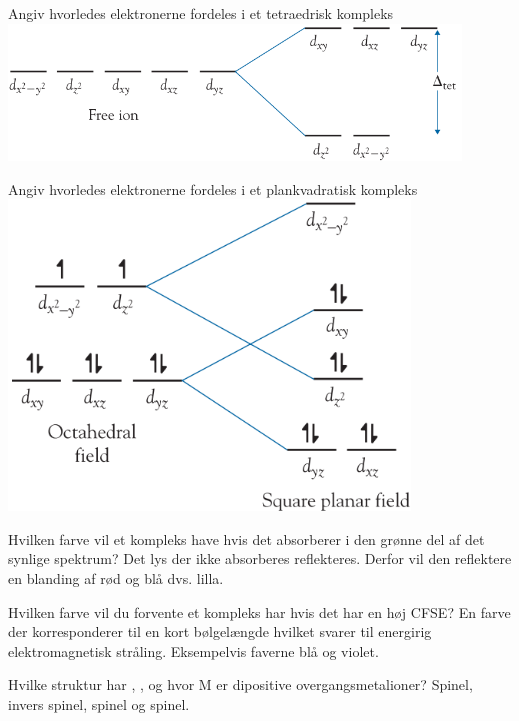 \begin{flashcard}[Teori]{Angiv hvorledes elektronerne fordeles i et tetraedrisk kompleks}
\includegraphics[width=0.9\textwidth]{figures/k19s516motet.png}
\end{flashcard}


\begin{flashcard}[Teori]{Angiv hvorledes elektronerne fordeles i et plankvadratisk kompleks}
\includegraphics[width=0.8\textwidth]{figures/k19s517mopk.png}
\end{flashcard}


\begin{flashcard}[Teori]{Hvilken farve vil et kompleks have hvis det absorberer i den grønne del af det synlige spektrum?}
Det lys der ikke absorberes reflekteres. Derfor vil den reflektere en blanding af rød og blå dvs. lilla.
\end{flashcard}


\begin{flashcard}[Teori]{Hvilken farve vil du forvente et kompleks har hvis det har en høj CFSE?}
En farve der korresponderer til en kort bølgelængde hvilket svarer til energirig elektromagnetisk stråling. Eksempelvis faverne blå og violet.
\end{flashcard}


\begin{flashcard}[Egenskab]{Hvilke struktur har , ,  og  hvor M er dipositive overgangsmetalioner?}
Spinel, invers spinel, spinel og spinel.
\end{flashcard}


